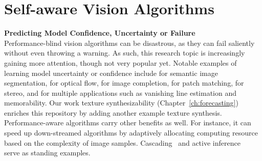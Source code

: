 \section{Self-aware Vision Algorithms}
\textbf{Predicting Model Confidence, Uncertainty or Failure}  \\
Performance-blind vision algorithms can be disastrous, as they can fail saliently without even throwing a warning. 
As such, this research topic is increasingly gaining more attention, though not very popular yet. Notable examples of learning model uncertainty or confidence include      
\citep{kendall2015bayesian} for semantic image segmentation, \citep{confidence:of:08, flow:confidence}  for  optical flow,  \citep{completion:quality} for image completion,  \citep{matchability} for patch matching, \citep{stereo:confidence} for stereo, and \citep{zhang2014predicting} for multiple applications such as vanishing line estimation and memorability.  Our work texture synthesizability (Chapter~\ref{ch:forecasting}) enriches this repository by adding another example texture synthesis. 
Performance-aware algorithms carry other benefits as well. For instance, it can speed up down-streamed algorithms by adaptively allocating computing resource based on the complexity of image samples.  Cascading~\citep{cascaded:01, felzenszwalb2010cascade} and active inference~\citep{liu2015multiclass} serve as standing examples. 

%   

